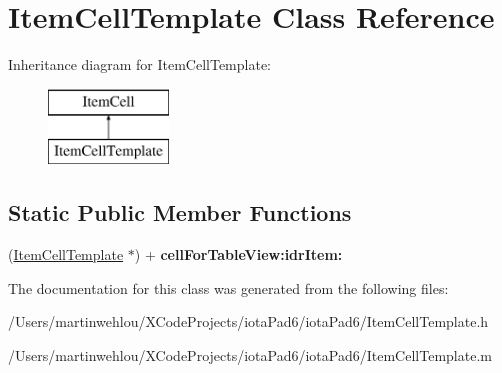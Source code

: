 \hypertarget{interface_item_cell_template}{
\section{ItemCellTemplate Class Reference}
\label{interface_item_cell_template}
}
Inheritance diagram for ItemCellTemplate:\begin{figure}[H]
\begin{center}
\leavevmode
\includegraphics[height=2.000000cm]{interface_item_cell_template}
\end{center}
\end{figure}
\subsection*{Static Public Member Functions}
\begin{DoxyCompactItemize}
\item 
\hypertarget{interface_item_cell_template_a6e521838c74c1f3d829ab58f75bbe618}{
(\hyperlink{interface_item_cell_template}{ItemCellTemplate} $\ast$) + {\bfseries cellForTableView:idrItem:}}
\label{interface_item_cell_template_a6e521838c74c1f3d829ab58f75bbe618}

\end{DoxyCompactItemize}


The documentation for this class was generated from the following files:\begin{DoxyCompactItemize}
\item 
/Users/martinwehlou/XCodeProjects/iotaPad6/iotaPad6/ItemCellTemplate.h\item 
/Users/martinwehlou/XCodeProjects/iotaPad6/iotaPad6/ItemCellTemplate.m\end{DoxyCompactItemize}
